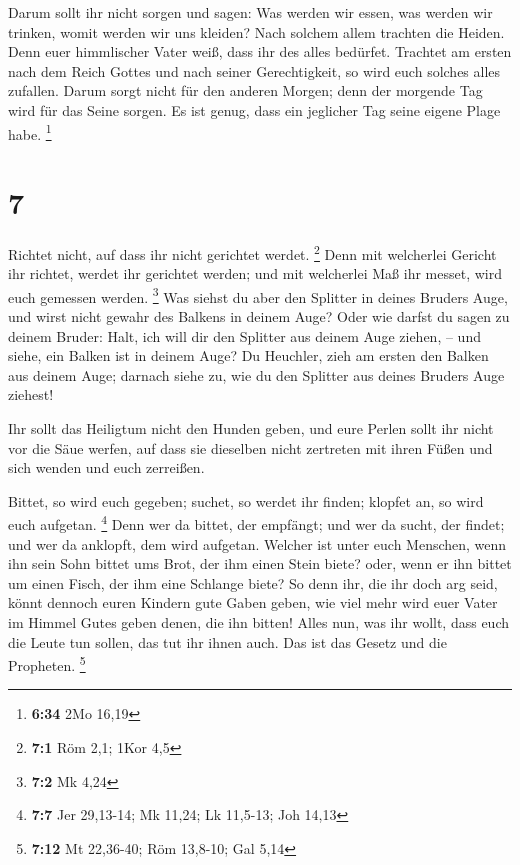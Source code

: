  Darum sollt ihr nicht sorgen und sagen: Was werden wir
essen, was werden wir trinken, womit werden wir uns kleiden?
 Nach solchem allem trachten die Heiden. Denn euer
himmlischer Vater weiß, dass ihr des alles bedürfet. 
Trachtet am ersten nach dem Reich Gottes und nach seiner Gerechtigkeit,
so wird euch solches alles zufallen.  Darum sorgt nicht
für den anderen Morgen; denn der morgende Tag wird für das Seine sorgen.
Es ist genug, dass ein jeglicher Tag seine eigene Plage habe.
\footnote{\textbf{6:34} 2Mo 16,19}

\hypertarget{section-5}{%
\section{7}\label{section-5}}

 Richtet nicht, auf dass ihr nicht gerichtet werdet.
\footnote{\textbf{7:1} Röm 2,1; 1Kor 4,5}  Denn mit
welcherlei Gericht ihr richtet, werdet ihr gerichtet werden; und mit
welcherlei Maß ihr messet, wird euch gemessen werden. \footnote{\textbf{7:2}
  Mk 4,24}  Was siehst du aber den Splitter in deines
Bruders Auge, und wirst nicht gewahr des Balkens in deinem Auge?
 Oder wie darfst du sagen zu deinem Bruder: Halt, ich will
dir den Splitter aus deinem Auge ziehen, -- und siehe, ein Balken ist in
deinem Auge?  Du Heuchler, zieh am ersten den Balken aus
deinem Auge; darnach siehe zu, wie du den Splitter aus deines Bruders
Auge ziehest!

 Ihr sollt das Heiligtum nicht den Hunden geben, und eure
Perlen sollt ihr nicht vor die Säue werfen, auf dass sie dieselben nicht
zertreten mit ihren Füßen und sich wenden und euch zerreißen.

 Bittet, so wird euch gegeben; suchet, so werdet ihr
finden; klopfet an, so wird euch aufgetan. \footnote{\textbf{7:7} Jer
  29,13-14; Mk 11,24; Lk 11,5-13; Joh 14,13}  Denn wer da
bittet, der empfängt; und wer da sucht, der findet; und wer da anklopft,
dem wird aufgetan.  Welcher ist unter euch Menschen, wenn
ihn sein Sohn bittet ums Brot, der ihm einen Stein biete?
 oder, wenn er ihn bittet um einen Fisch, der ihm eine
Schlange biete?  So denn ihr, die ihr doch arg seid,
könnt dennoch euren Kindern gute Gaben geben, wie viel mehr wird euer
Vater im Himmel Gutes geben denen, die ihn bitten!  Alles
nun, was ihr wollt, dass euch die Leute tun sollen, das tut ihr ihnen
auch. Das ist das Gesetz und die Propheten. \footnote{\textbf{7:12} Mt
  22,36-40; Röm 13,8-10; Gal 5,14}

